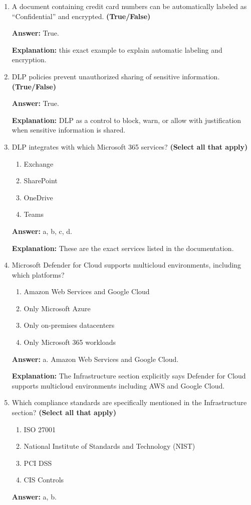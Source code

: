 \documentclass[10pt]{article}
\begin{document}
\begin{enumerate}[leftmargin=*]
\textbf{Explanation:} This is the primary function described in the Data pillar.

\item A document containing credit card numbers can be automatically labeled as ``Confidential'' and encrypted. \textbf{(True/False)}

\textbf{Answer:} True.

\textbf{Explanation:} this exact example to explain automatic labeling and encryption.

\item DLP policies prevent unauthorized sharing of sensitive information. \textbf{(True/False)}

\textbf{Answer:} True.

\textbf{Explanation:} DLP as a control to block, warn, or allow with justification when sensitive information is shared.

\item DLP integrates with which Microsoft 365 services? \textbf{(Select all that apply)}
\begin{enumerate}[label=\alph*., leftmargin=1.5em]
\item Exchange
\item SharePoint
\item OneDrive
\item Teams
\end{enumerate}
\textbf{Answer:} a, b, c, d.

\textbf{Explanation:} These are the exact services listed in the documentation.

\item Microsoft Defender for Cloud supports multicloud environments, including which platforms?
\begin{enumerate}[label=\alph*., leftmargin=1.5em]
\item Amazon Web Services and Google Cloud
\item Only Microsoft Azure
\item Only on-premises datacenters
\item Only Microsoft 365 workloads
\end{enumerate}
\textbf{Answer:} a. Amazon Web Services and Google Cloud.

\textbf{Explanation:} The Infrastructure section explicitly says Defender for Cloud supports multicloud environments including AWS and Google Cloud.

\item Which compliance standards are specifically mentioned in the Infrastructure section? \textbf{(Select all that apply)}
\begin{enumerate}[label=\alph*., leftmargin=1.5em]
\item ISO 27001
\item National Institute of Standards and Technology (NIST)
\item PCI DSS
\item CIS Controls
\end{enumerate}
\textbf{Answer:} a, b.


\end{enumerate}
\end{document}
